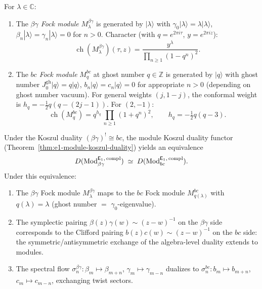\begin{definition}
\label{def:bg-bc-fock}
For $\lambda \in \mathbb{C}$:
\begin{enumerate}[label=\textup{(\roman*)}]
\item The \emph{$\beta\gamma$ Fock module} $M_\lambda^{\beta\gamma}$
  is generated by $|\lambda\rangle$ with
  $\gamma_0|\lambda\rangle = \lambda|\lambda\rangle$,
  $\beta_n|\lambda\rangle = \gamma_n|\lambda\rangle = 0$ for
  $n > 0$.  Character (with $q = e^{2\pi i\tau}$,
  $y = e^{2\pi i z}$):
  \[
  \operatorname{ch}(M_\lambda^{\beta\gamma})(\tau, z)
  = \frac{y^{\lambda}}{\prod_{n \geq 1}(1 - q^n)^2}.
  \]
\item The \emph{$bc$ Fock module} $M_q^{bc}$ at ghost number
  $q \in \mathbb{Z}$ is generated by $|q\rangle$ with
  ghost number $J_0^{\mathrm{gh}}|q\rangle = q|q\rangle$,
  $b_n|q\rangle = c_n|q\rangle = 0$ for appropriate
  $n > 0$ (depending on ghost number vacuum).
  For general weights $(j, 1{-}j)$, the conformal weight is
  $h_q = -\tfrac{1}{2}q(q - (2j{-}1))$.  For $(2, -1)$:
  \[
  \operatorname{ch}(M_q^{bc})
  = q^{h_q}\,\prod_{n \geq 1}(1 + q^n)^2,
  \qquad h_q = -\tfrac{1}{2}q(q-3).
  \]
\end{enumerate}
\end{definition}

\begin{proposition}
\label{prop:bg-bc-module-kd}
Under the Koszul duality $(\beta\gamma)^! \cong bc$, the
module Koszul duality functor
\textup{(}Theorem~\textup{\ref{thm:e1-module-koszul-duality})}
yields an equivalence
\begin{equation}\label{eq:bg-bc-module-equiv}
D(\mathrm{Mod}^{\mathsf{E}_1,\,\mathrm{compl}}_{\beta\gamma})
\;\simeq\;
D(\mathrm{Mod}^{\mathsf{E}_1,\,\mathrm{compl}}_{bc}).
\end{equation}
Under this equivalence:
\begin{enumerate}[label=\textup{(\roman*)}]
\item The $\beta\gamma$ Fock module $M_\lambda^{\beta\gamma}$
  maps to the $bc$ Fock module $M_{q(\lambda)}^{bc}$ with
  $q(\lambda) = \lambda$ \textup{(}ghost number
  $=$ $\gamma_0$-eigenvalue\textup{)}.
\item The symplectic pairing
  $\beta(z)\gamma(w) \sim (z-w)^{-1}$ on the $\beta\gamma$ side
  corresponds to the Clifford pairing
  $b(z)c(w) \sim (z-w)^{-1}$ on the $bc$ side: the
  symmetric/antisymmetric exchange of the algebra-level duality
  extends to modules.
\item The spectral flow
  $\sigma_n^{\beta\gamma}: \beta_m \mapsto \beta_{m+n}$,
  $\gamma_m \mapsto \gamma_{m-n}$ dualizes to
  $\sigma_n^{bc}: b_m \mapsto b_{m+n}$,
  $c_m \mapsto c_{m-n}$, exchanging twist sectors.
\end{enumerate}
\end{proposition}

